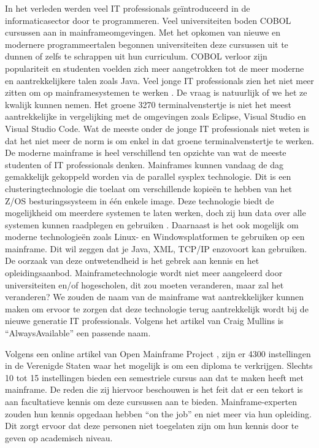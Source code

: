 In het verleden werden veel IT professionals geïntroduceerd in de informaticasector door te programmeren. Veel universiteiten boden COBOL cursussen aan in mainframeomgevingen. Met het opkomen van nieuwe en modernere programmeertalen begonnen universiteiten deze cursussen uit te dunnen of zelfs te schrappen uit hun curriculum. COBOL verloor zijn populariteit en studenten voelden zich meer aangetrokken tot de meer moderne en aantrekkelijkere talen zoals Java. Veel jonge IT professionals zien het niet meer zitten om op mainframesystemen te werken \autocite{Mullins2016}. De vraag is natuurlijk of we het ze kwalijk kunnen nemen. Het groene 3270 terminalvenstertje is niet het meest aantrekkelijke in vergelijking met de omgevingen zoals Eclipse, Visual Studio en Visual Studio Code. Wat de meeste onder de jonge IT professionals niet weten is dat het niet meer de norm is om enkel in dat groene terminalvenstertje te werken. De moderne mainframe is heel verschillend ten opzichte van wat de meeste studenten of IT professionals denken. Mainframes kunnen vandaag de dag gemakkelijk gekoppeld worden via de parallel sysplex technologie. Dit is een clusteringtechnologie die toelaat om verschillende kopieën te hebben van het Z/OS besturingssysteem in één enkele image. Deze technologie biedt de mogelijkheid om meerdere systemen te laten werken, doch zij hun data over alle systemen kunnen raadplegen en gebruiken \autocite{Sarkar2020}. Daarnaast is het ook mogelijk om moderne technologieën zoals Linux- en Windowsplatformen te gebruiken op een mainframe. Dit wil zeggen dat je Java, XML, TCP/IP enzovoort kan gebruiken. De oorzaak van deze ontwetendheid is het gebrek aan kennis en het opleidingsaanbod. Mainframetechnologie wordt niet meer aangeleerd door universiteiten en/of hogescholen, dit zou moeten veranderen, maar zal het veranderen? We zouden de naam van de mainframe wat aantrekkelijker kunnen maken om ervoor te zorgen dat deze technologie terug aantrekkelijk wordt bij de nieuwe generatie IT professionals. Volgens het artikel van Craig Mullins is ``AlwaysAvailable'' een passende naam. 

Volgens een online artikel van Open Mainframe Project \autocite{2020}, zijn er 4300 instellingen in de Verenigde Staten waar het mogelijk is om een diploma te verkrijgen. Slechts 10 tot 15 instellingen bieden een semestriele cursus aan dat te maken heeft met mainframe. De reden die zij hiervoor beschouwen is het feit dat er een tekort is aan facultatieve kennis om deze cursussen aan te bieden. Mainframe-experten zouden hun kennis opgedaan hebben ``on the job'' en niet meer via hun opleiding. Dit zorgt ervoor dat deze personen niet toegelaten zijn om hun kennis door te geven op academisch niveau. 

\section{}
\label{sec:Is de mainframe aan het uitsterven?}

\subsection{}
\label{sec:IBM Z16}